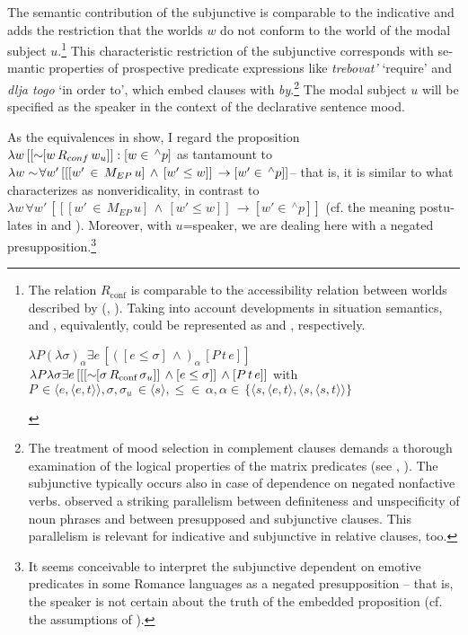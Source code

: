 \documentclass[output=paper,colorlinks,citecolor=brown]{langscibook}
\begin{document}
\begin{otherlanguage}{english}
\noindent The semantic contribution of the subjunctive is comparable to the indicative and adds the restriction that the worlds $w$ do not conform to the world of the modal subject $u$.\footnote{The relation $R_\text{conf}$ is comparable to the accessibility relation between worlds described by \citeauthor{Kratzer1991} (\citeyear{Kratzer1991}, \citeyear{Kratzer1991b}). Taking into account developments in situation semantics,  and , equivalently, could be represented as  and , respectively.

\begin{exe}
\ex    $\lambda P (\lambda \sigma)_{\alpha} \exists e \, [([e \leq \sigma] \, \wedge)_{\alpha} \, [P \, t \, e]]  $ \label{ex:16:1infn23}
\ex    $ \lambda P \lambda \sigma \exists e \, [[[\sim \negthinspace \negthinspace[\sigma \, R_\text{conf} \, \sigma_{u}]] \, \wedge [e \leq \sigma]] \, \wedge  [P \, t \, e]] \newline   $ 
with $ P \, \in \langle e, \langle e,t \rangle \rangle, \sigma, \sigma_{u} \, \in \langle s \rangle, \leq \in \, \alpha, \alpha \in \, \{ \langle s, \langle e,t \rangle, \langle s, \langle s, t \rangle \rangle \}   $ \label{ex:16:2infn23}
\end{exe} \label{kremn}

} This characteristic restriction of the subjunctive corresponds with semantic properties of prospective predicate expressions like \textit{trebovat'} `require' and \textit{dlja togo} `in order to', which embed clauses with \textit{by}.\footnote{The treatment of mood selection in complement clauses demands a thorough examination of the logical properties of the matrix predicates (see \citeauthor{Schwabe-Fittler2014} \citeyear{Schwabe-Fittler2014}, \citeyear{Schwabe-Fittler2014a}). The subjunctive typically occurs also in case of dependence on negated nonfactive verbs. \textcite{Dahl1971} observed a striking parallelism between definiteness and unspecificity of noun phrases and between presupposed and subjunctive clauses. This parallelism is relevant for indicative and subjunctive in relative clauses, too.} The modal subject $u$ will be specified as the speaker in the context of the declarative sentence mood.

As the equivalences in  show, I regard the proposition $\lambda w \, [[\sim \negthinspace \negthinspace [w \, R_{conf} \, w_{u}]] : [w \in \, ^{\wedge}p]$ as tantamount to $\lambda w \sim \negthinspace  \forall w' \, [[[w' \, \in \, M_{EP} \, u] \, \wedge \, [w' \leq w]] \, \to [w' \in \, ^{\wedge}p]]$-- that is, it is similar to what \textcite{Giannakidou2016} characterizes as nonveridicality, in contrast to $ \lambda w \, \forall w' \, [[[ w' \, \in \, M_{EP} \, u] \, \wedge \, [w' \leq w]] \, \to [w' \in \, ^{\wedge}p]]$ (cf. the meaning postulates in  and ). Moreover, with $u$=speaker, we are dealing here with a negated presupposition.\footnote{It seems conceivable to interpret the subjunctive dependent on emotive predicates in some Romance languages as a negated presupposition -- that is, the speaker is not certain about the truth of the embedded proposition (cf. the assumptions of \citealt{Giannakidou2016}).
}


\end{otherlanguage}
\end{document}
